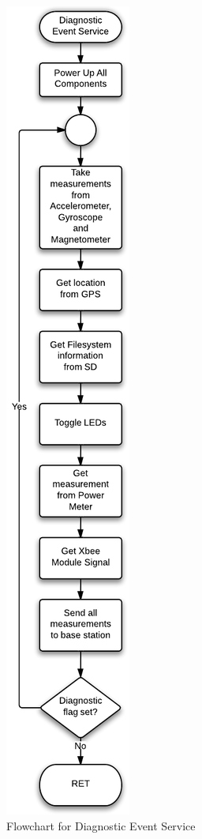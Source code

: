 \begin{figure}[H]
	\centering
	\includegraphics[scale=0.7]{img/DiagnosticEventService}
	\caption{Flowchart for Diagnostic Event Service \label{fig:diagnosticMode}}
\end{figure}

